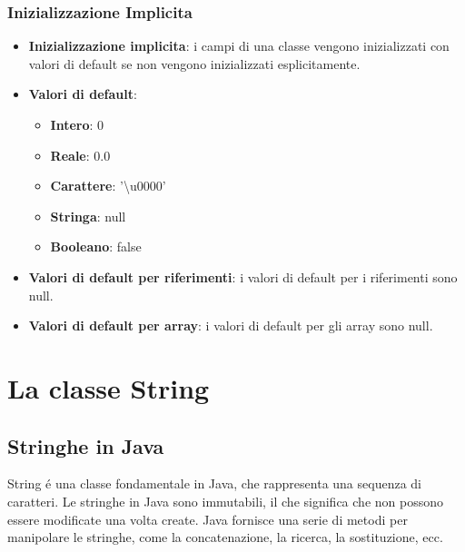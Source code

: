 \documentclass[11pt]{article}
\begin{document}
\subsubsection{Inizializzazione Implicita}
\begin{itemize}
    \item \textbf{Inizializzazione implicita}: i campi di una classe vengono inizializzati con valori di default se non vengono inizializzati esplicitamente.
    \item \textbf{Valori di default}: \begin{itemize}
        \item \textbf{Intero}: 0
        \item \textbf{Reale}: 0.0
        \item \textbf{Carattere}: '\textbackslash u0000'
        \item \textbf{Stringa}: null
        \item \textbf{Booleano}: false
        \end{itemize}
    \item \textbf{Valori di default per riferimenti}: i valori di default per i riferimenti sono null.
    \item \textbf{Valori di default per array}: i valori di default per gli array sono null.
\end{itemize}
\section{La classe String}
\subsection{Stringhe in Java}
String é una classe fondamentale in Java, che rappresenta una sequenza di caratteri.
Le stringhe in Java sono immutabili, il che significa che non possono essere modificate una volta create.
Java fornisce una serie di metodi per manipolare le stringhe, come la concatenazione, la ricerca, la sostituzione, ecc.
\end{document}
